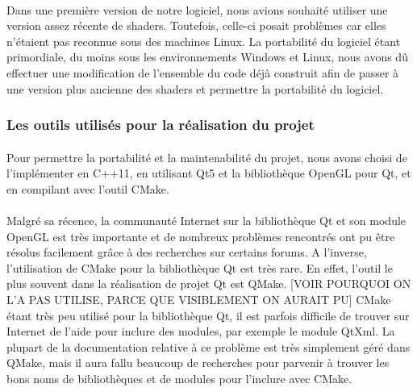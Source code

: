 \paragraph{}
Dans une première version de notre logiciel, nous avions souhaité utiliser une version assez récente de shaders. Toutefois, celle-ci posait problèmes car elles n'étaient pas reconnue sous des machines Linux. La portabilité du logiciel étant primordiale, du moins sous les environnements Windows et Linux, nous avons dû effectuer une modification de l'ensemble du code déjà construit afin de passer à une version plus ancienne des shaders et permettre la portabilité du logiciel.

\subsubsection{Les outils utilisés pour la réalisation du projet}
\paragraph{}
Pour permettre la portabilité et la maintenabilité du projet, nous avons choisi de l'implémenter en C++11, en utilisant Qt5 et la bibliothèque OpenGL pour Qt, et en compilant avec l'outil CMake.

\paragraph{}
Malgré sa récence, la communauté Internet sur la bibliothèque Qt et son module OpenGL est très importante et de nombreux problèmes rencontrés ont pu être résolus facilement grâce à des recherches sur certains forums. A l'inverse, l'utilisation de CMake pour la bibliothèque Qt est très rare.
En effet, l'outil le plus souvent dans la réalisation de projet Qt est QMake. [VOIR POURQUOI ON L'A PAS UTILISE, PARCE QUE VISIBLEMENT ON AURAIT PU]
CMake étant très peu utilisé pour la bibliothèque Qt, il est parfois difficile de trouver sur Internet de l'aide pour inclure des modules, par exemple le module QtXml. La plupart de la documentation relative à ce problème est très simplement géré dans QMake, mais il aura fallu beaucoup de recherches pour parvenir à trouver les bons noms de bibliothèques et de modules pour l'inclure avec CMake.
